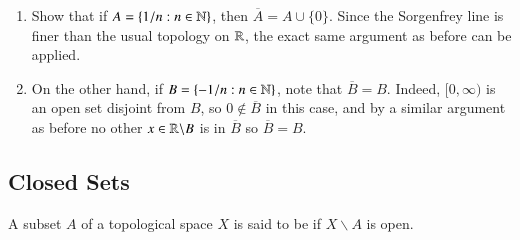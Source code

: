 \documentclass[12pt, a4paper, oneside, openright, titlepage]{book}
\begin{document}
\begin{eg}
\begin{enumerate}
\begin{enumerate}
                \item Show that if $A = \{1/n:n \in \mathbb N\}$, then $\overline{A} = A\cup\{0\}$. Since the Sorgenfrey line is finer than the usual topology on $\mathbb R$, the exact same argument as before can be applied.
                \item On the other hand, if $B = \{-1/n:n \in \mathbb N\}$, note that $\overline{B} = B$. Indeed, $[0,\infty)$ is an open set disjoint from $B$, so $0 \notin \overline{B}$ in this case, and by a similar argument as before no other $x \in \mathbb R\backslash B$ is in $\overline{B}$ so $\overline{B} = B$.
        \end{enumerate}
    \end{enumerate}
\end{eg}



\subsection{Closed Sets}

\begin{defn}
    A subset $A$ of a topological space $X$ is said to be  if $X\backslash A$ is open.
\end{defn}
\end{document}
